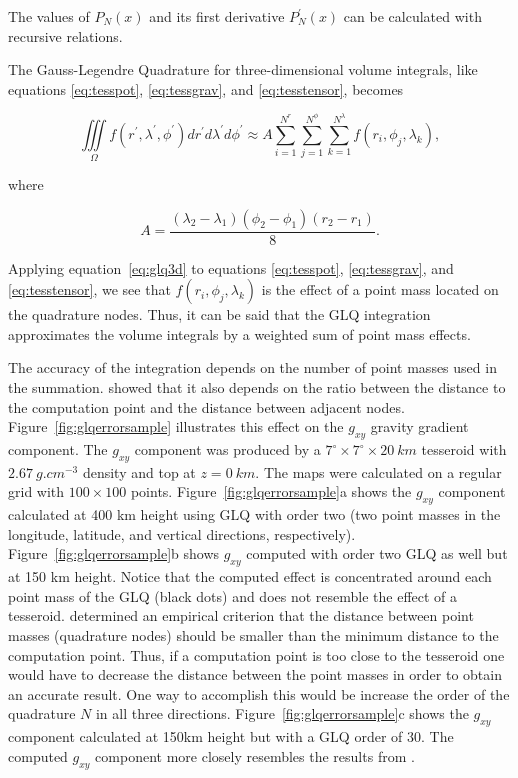 \documentclass[paper,twocolumn]{geophysics}
\begin{document}
\noindent
The values of $P_N(x)$ and its first derivative $P^\prime_N(x)$
can be calculated with recursive relations.

The Gauss-Legendre Quadrature for three-dimensional volume integrals,
like equations
\ref{eq:tesspot}, \ref{eq:tessgrav}, and \ref{eq:tesstensor},
becomes \citep{Asgharzadeh2007}

\begin{equation}
    \iiint\limits_{\Omega}
    f(r^\prime, \lambda^\prime, \phi^\prime)
    dr^\prime d\lambda^\prime d\phi^\prime
    \approx
    A
    \sum\limits_{i=1}^{N^r}
    \sum\limits_{j=1}^{N^\phi}
    \sum\limits_{k=1}^{N^\lambda}
    f(r_i, \phi_j, \lambda_k),
    \label{eq:glq3d}
\end{equation}

\noindent
where

\begin{equation}
    A = \frac{(\lambda_2 - \lambda_1)(\phi_2 - \phi_1)(r_2 - r_1)}{8}.
\end{equation}

Applying equation~\ref{eq:glq3d} to equations
\ref{eq:tesspot}, \ref{eq:tessgrav}, and \ref{eq:tesstensor},
we see that $f(r_i, \phi_j, \lambda_k)$ is the effect of a point
mass located on the quadrature nodes.
Thus, it can be said that the GLQ integration
approximates the volume integrals  by a
weighted sum of point mass effects.

The accuracy of the integration
depends on the number of point masses used in the summation.
\citet{Ku1977} showed that it also depends on the ratio between
the distance to the computation point and the distance between adjacent nodes.
Figure~\ref{fig:glqerrorsample}
illustrates this effect on the $g_{xy}$ gravity gradient component.
The $g_{xy}$ component was produced by a
$7^\circ \times 7^\circ \times 20\ km$ tesseroid
with $2.67\ g.cm^{-3}$ density
and top at $z=0\ km$.
The maps were calculated on a regular grid
with $100\times100$ points.
Figure~\ref{fig:glqerrorsample}a shows the $g_{xy}$ component
calculated at 400 km height using
GLQ with order two (two point masses in the longitude, latitude, and vertical
directions, respectively).
Figure~\ref{fig:glqerrorsample}b shows $g_{xy}$ computed with order two
GLQ as well but at 150 km height.
Notice that the computed effect is concentrated around each point mass
of the GLQ (black dots) and does not resemble the effect of a tesseroid.
\citet{Ku1977} determined an empirical criterion that the distance between
point masses (quadrature nodes) should be smaller than the minimum distance to
the computation point.
Thus, if a computation point is too close to the tesseroid one would have to
decrease the distance between the point masses in order to obtain an accurate
result.
One way to accomplish this would be increase the order of the quadrature
$N$ in all three directions.
Figure~\ref{fig:glqerrorsample}c shows the $g_{xy}$ component calculated at
150km height but with a GLQ order of 30.
The computed $g_{xy}$ component more closely resembles the results from
\citet{Asgharzadeh2007}.
\end{document}
